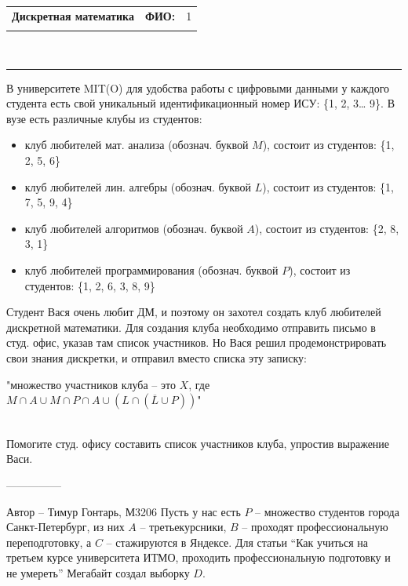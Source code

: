\documentclass[10pt]{exam}
\newcommand{\class}{Дискретная математика}
\newcommand{\examdate}{}
\begin{document}
\pagestyle{head}
\firstpageheader{}{}{}
\runningheader{\class}{}{\examdate}
\runningheadrule
\begin{flushright}
\begin{tabular}{p{2.8in} r l}
\textbf{\class} & \textbf{ФИО:} &1\\

\textbf{\examdate} &&\\
\end{tabular}\\
\end{flushright}
\rule[1ex]{\textwidth}{.1pt}


\begin{questions}
\question
В университете MIT(O) для удобства работы с цифровыми данными у каждого студента есть свой уникальный идентификационный номер ИСУ: \{1, 2, 3… 9\}. В вузе есть различные клубы из студентов:
\begin{itemize}
    \item клуб любителей мат. анализа (обознач. буквой $M$), состоит из студентов: \{1, 2, 5, 6\}
    \item клуб любителей лин. алгебры (обознач. буквой $L$), состоит из студентов: \{1, 7, 5, 9, 4\}
    \item клуб любителей алгоритмов (обознач. буквой $A$), состоит из студентов: \{2, 8, 3, 1\}
    \item клуб любителей программирования (обознач. буквой $P$), состоит из студентов: \{1, 2, 6, 3, 8, 9\}
\end{itemize}
Студент Вася очень любит ДМ, и поэтому он захотел создать клуб любителей дискретной математики. Для создания клуба необходимо отправить письмо в студ. офис, указав там список участников. Но Вася решил продемонстрировать свои знания дискретки, и отправил вместо списка эту записку:
\begin{center}
"множество участников клуба -- это $X$, где $M \cap A \cup M \cap P \cap A \cup (L \cap (\overline{L} \cup P))$"
\end{center}
\\
Помогите студ. офису составить список участников клуба, упростив выражение Васи.

---------------

Автор -- Тимур Гонтарь, М3206\question
Пусть у нас есть $P$ -- множество студентов города Санкт-Петербург, из них $A$ -- третьекурсники, $B$ -- проходят профессиональную переподготовку, а $C$ -- стажируются в Яндексе. Для статьи “Как учиться на третьем курсе университета ИТМО, проходить профессиональную подготовку и не умереть” Мегабайт создал выборку $D$.


\end{questions}
\end{document}
